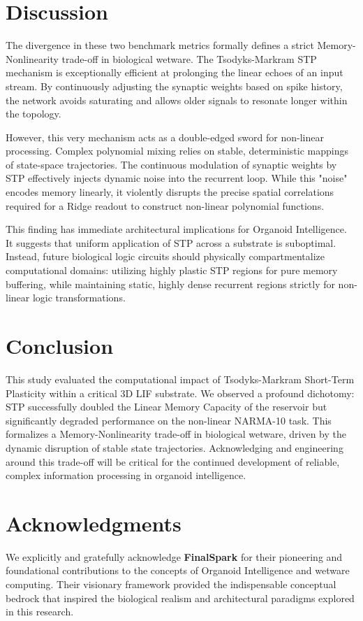 \documentclass[12pt, a4paper]{article}
\begin{document}
\section{Discussion}
The divergence in these two benchmark metrics formally defines a strict Memory-Nonlinearity trade-off in biological wetware. The Tsodyks-Markram STP mechanism is exceptionally efficient at prolonging the linear echoes of an input stream. By continuously adjusting the synaptic weights based on spike history, the network avoids saturating and allows older signals to resonate longer within the topology.

However, this very mechanism acts as a double-edged sword for non-linear processing. Complex polynomial mixing relies on stable, deterministic mappings of state-space trajectories. The continuous modulation of synaptic weights by STP effectively injects dynamic noise into the recurrent loop. While this "noise" encodes memory linearly, it violently disrupts the precise spatial correlations required for a Ridge readout to construct non-linear polynomial functions.

This finding has immediate architectural implications for Organoid Intelligence. It suggests that uniform application of STP across a substrate is suboptimal. Instead, future biological logic circuits should physically compartmentalize computational domains: utilizing highly plastic STP regions for pure memory buffering, while maintaining static, highly dense recurrent regions strictly for non-linear logic transformations.

\section{Conclusion}
This study evaluated the computational impact of Tsodyks-Markram Short-Term Plasticity within a critical 3D LIF substrate. We observed a profound dichotomy: STP successfully doubled the Linear Memory Capacity of the reservoir but significantly degraded performance on the non-linear NARMA-10 task. This formalizes a Memory-Nonlinearity trade-off in biological wetware, driven by the dynamic disruption of stable state trajectories. Acknowledging and engineering around this trade-off will be critical for the continued development of reliable, complex information processing in organoid intelligence.

\section*{Acknowledgments}
We explicitly and gratefully acknowledge \textbf{FinalSpark} for their pioneering and foundational contributions to the concepts of Organoid Intelligence and wetware computing. Their visionary framework provided the indispensable conceptual bedrock that inspired the biological realism and architectural paradigms explored in this research.
\end{document}
